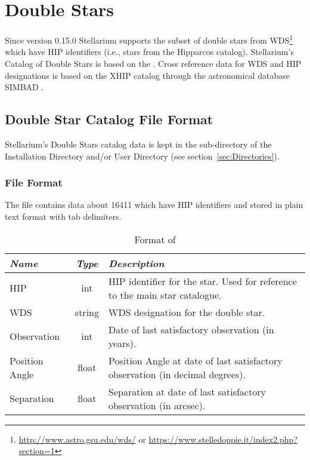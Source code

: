 \section{Double Stars}
\label{sec:StarCatalogues:DoubleStars}

Since version 0.15.0 Stellarium supports the subset of double stars
from WDS\footnote{\url{http://www.astro.gsu.edu/wds/} or \url{https://www.stelledoppie.it/index2.php?section=1}} which have HIP
identifiers (i.e., stars from the Hipparcos catalog). Stellarium's Catalog
of Double Stars is based on the . %
Cross reference data for WDS and HIP designations is based on the 
XHIP catalog \citep{2012AstL...38..331A} through the astronomical 
database SIMBAD  \citep{2000A&AS..143....9W}.

\subsection{Double Star Catalog File Format}
\label{sec:StarCatalogues:DoubleStars:format}


Stellarium's Double Stars catalog data is kept
in the  sub-directory of the Installation Directory and/or
User Directory (see section~\ref{sec:Directories}).


\subsubsection{File Format}
\label{sec:StarCatalogues:DoubleStars:file}

The  file contains data about 16411
 which have HIP identifiers and
stored in plain text format with tab delimiters.

\begin{table}[htb]
\begin{tabularx}{\textwidth}{l|c|X}\toprule
\emph{Name} & \emph{Type} & \emph{Description}\\\midrule
HIP      		& int    & HIP identifier for the star. Used for reference to the main star catalogue.\\%
WDS      		& string & WDS designation for the double star.\\%
Observation		& int	 & Date of last satisfactory observation (in years).\\%
Position Angle  & float  & Position Angle at date of last satisfactory observation (in decimal degrees).\\%
Separation 		& float  & Separation at date of last satisfactory observation (in arcsec).\\\bottomrule
\end{tabularx}
\caption{Format of }
\label{tab:StarCatalogues:DoubleStars:file}
\end{table}

